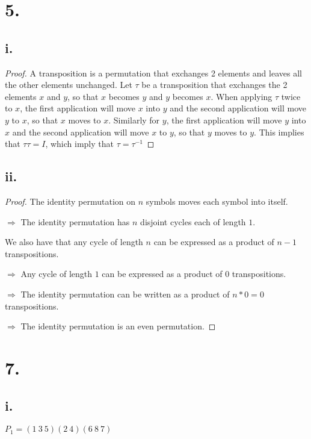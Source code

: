 \documentclass{article}
\begin{document}
\section*{5.}
\subsection*{i.}
\begin{proof}
  A transposition is a permutation that exchanges 2 elements and leaves all the other elements unchanged. Let $\tau$ be a transposition that exchanges the 2 elements $x$ and $y$, so that $x$ becomes $y$ and $y$ becomes $x$. When applying $\tau$ twice to $x$, the first application will move $x$ into $y$ and the second application will move $y$ to $x$, so that $x$ moves to $x$. Similarly for $y$, the first application will move $y$ into $x$ and the second application will move $x$ to $y$, so that $y$ moves to $y$. This implies that $\tau\tau=I$, which imply that $\tau = \tau^{-1}$

\end{proof}

\subsection*{ii.}
\begin{proof}
  The identity permutation on $n$ symbols moves each symbol into itself.
  
  \noindent
  $\Rightarrow$ The identity permutation has $n$ disjoint cycles each of length $1$. \label{sec:my-nice-section}
  \newline

  \noindent
  We also have that any cycle of length $n$ can be expressed as a product of $n-1$ transpositions.
  
  \noindent
  $\Rightarrow$ Any cycle of length $1$ can be expressed as a product of $0$ transpositions.
  \newline

  \noindent
  $\Rightarrow$ The identity permutation can be written as a product of $n*0 = 0$ transpositions.
  
  \noindent
  $\Rightarrow$ The identity permutation is an even permutation.

\end{proof}

\section*{7.}
\subsection*{i.}
$P_1 = (1 \ 3 \ 5) (2 \ 4) (6 \ 8 \ 7)$
\end{document}
